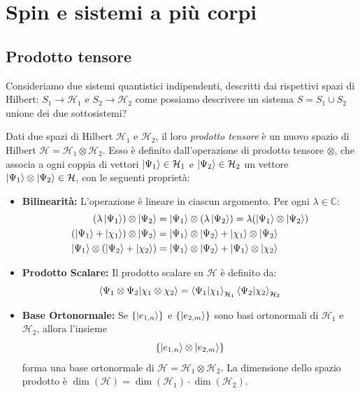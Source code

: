\chapter{Spin e sistemi a più corpi}

\section{Prodotto tensore}

Consideriamo due sistemi quantistici indipendenti, descritti dai rispettivi spazi di Hilbert: \(S_1\to \mathcal{H}_1\) e \(S_2\to \mathcal{H}_2\)
come possiamo descrivere un sistema \(S = S_1 \cup S_2\) unione dei due sottosistemi?

\begin{definition}
    Dati due spazi di Hilbert \(\mathcal{H}_1\) e \(\mathcal{H}_2\), il loro \textit{prodotto tensore} è un nuovo spazio di Hilbert \(\mathcal{H} = \mathcal{H}_1 \otimes \mathcal{H}_2\).
    Esso è definito dall'operazione di prodotto tensore \(\otimes\), che associa a ogni coppia di vettori \(\ket{\Psi_1} \in \mathcal{H}_1\) e \(\ket{\Psi_2} \in \mathcal{H}_2\) un vettore \(\ket{\Psi_1} \otimes \ket{\Psi_2} \in \mathcal{H}\), con le seguenti proprietà:
    \begin{itemize}
        \item \textbf{Bilinearità:} L'operazione è lineare in ciascun argomento. Per ogni \(\lambda \in \mathbb{C}\):
        \begin{align*}
            (\lambda \ket{\Psi_1}) \otimes \ket{\Psi_2} &= \ket{\Psi_1} \otimes (\lambda \ket{\Psi_2}) = \lambda (\ket{\Psi_1} \otimes \ket{\Psi_2}) \\
            (\ket{\Psi_1} + \ket{\chi_1}) \otimes \ket{\Psi_2} &= \ket{\Psi_1} \otimes \ket{\Psi_2} + \ket{\chi_1} \otimes \ket{\Psi_2} \\
            \ket{\Psi_1} \otimes (\ket{\Psi_2} + \ket{\chi_2}) &= \ket{\Psi_1} \otimes \ket{\Psi_2} + \ket{\Psi_1} \otimes \ket{\chi_2}
        \end{align*}
        \item \textbf{Prodotto Scalare:} Il prodotto scalare su \(\mathcal{H}\) è definito da:
        \begin{equation}
            \braket{\Psi_1 \otimes \Psi_2}{\chi_1 \otimes \chi_2} = \braket{\Psi_1}{\chi_1}_{\mathcal{H}_1} \braket{\Psi_2}{\chi_2}_{\mathcal{H}_2}
        \end{equation}
        \item \textbf{Base Ortonormale:} Se \(\{\ket{e_{1,n}}\}\) e \(\{\ket{e_{2,m}}\}\) sono basi ortonormali di \(\mathcal{H}_1\) e \(\mathcal{H}_2\), allora l'insieme
        \begin{equation}
            \left\{ \ket{e_{1,n}} \otimes \ket{e_{2,m}} \right\}
        \end{equation}
        forma una base ortonormale di \(\mathcal{H} = \mathcal{H}_1 \otimes \mathcal{H}_2\). La dimensione dello spazio prodotto è \(\dim(\mathcal{H}) = \dim(\mathcal{H}_1) \cdot \dim(\mathcal{H}_2)\).
    \end{itemize}
\end{definition}
